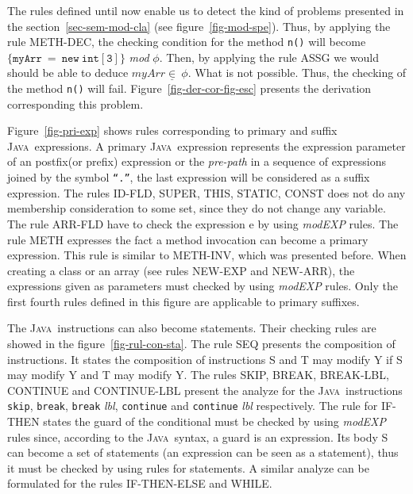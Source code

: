 \documentclass[a4paper]{llncs}
\newcommand{\java}{\textsc{Java}}
\begin{document}
The rules defined until now enable us to detect the kind of problems
presented in the section~\ref{sec-sem-mod-cla} (see
figure~\ref{fig-mod-spe}). Thus, by applying the rule
\textup{METH-DEC}, the checking condition for the method \texttt{n()}
will become $\mathtt{\{myArr\ =\ new\ int[3]\}}$ \textit{mod}
$\phi$. Then,
by applying the rule \textup{ASSG} we would should be able to
deduce $myArr\underline\in\ \phi$. What is not possible. Thus, the
checking
of the method \texttt{n()} will fail. Figure~\ref{fig-der-cor-fig-esc}
presents the derivation corresponding this problem.

Figure~\ref{fig-pri-exp} shows rules corresponding to
primary and suffix \java~expressions. A primary \java~expression
represents the expression parameter of an postfix(or prefix)
expression
or the \emph{pre-path} in a sequence of expressions joined by the
symbol \texttt{``.''}, the 
last expression will be considered as a suffix expression. The rules
\textup{ID-FLD}, \textup{SUPER}, \textup{THIS}, \textup{STATIC},
\textup{CONST} does not do any membership consideration to some set,
since they do not change any variable. The rule \textup{ARR-FLD} have
to check the expression \textup{e} by using \textit{modEXP}
rules. The rule \textup{METH} expresses the fact a method invocation
can become a primary expression. This rule is similar to
\textup{METH-INV}, which was presented before. When creating a class
or an array (see rules \textup{NEW-EXP} and \textup{NEW-ARR}), the
expressions given as parameters must checked by using \textit{modEXP}
rules. Only the first fourth rules defined in this figure are applicable
to primary suffixes. %

The \java~instructions can also become statements.  Their checking
rules are showed in the figure~\ref{fig-rul-con-sta}. The rule
\textup{SEQ} presents the composition of instructions. It states the
composition of instructions \textup{S} and \textup{T} may modify
\textsc{Y} if \textup{S} may modify \textsc{Y} and \textup{T} may
modify \textsc{Y}. The rules \textup{SKIP}, \textup{BREAK},
\textup{BREAK-LBL}, \textup{CONTINUE} and \textup{CONTINUE-LBL}
present the analyze for the \java~instructions \texttt{skip},
\texttt{break}, \texttt{break} \emph{lbl}, \texttt{continue} and
\texttt{continue} \emph{lbl} respectively. The rule for
\textup{IF-THEN}
states the guard of the conditional must be checked by using
\textit{modEXP} rules since, according to the \java~syntax, a guard is
an expression. Its body \textsc{S} can become a set of statements (an
expression can be seen as a statement), thus it must be checked by
using rules for statements. A similar analyze can be formulated for the
rules \textup{IF-THEN-ELSE} and \textup{WHILE}. %
\end{document}
